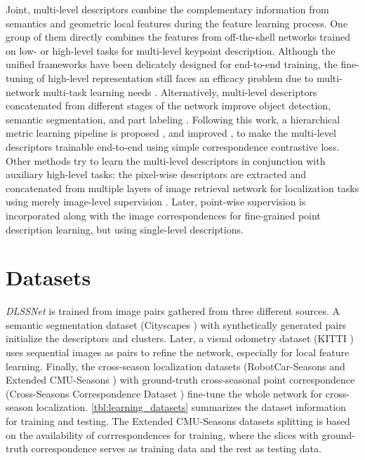 Joint, multi-level descriptors combine the complementary information from semantics and geometric local features during the feature learning process.  
One group of them \cite{luo2019contextdesc, hong2020learning} directly combines the features from off-the-shell networks trained on low- or high-level tasks for multi-level keypoint description.
Although the unified frameworks have been delicately designed for end-to-end training, the fine-tuning of high-level representation still faces an efficacy problem due to multi-network multi-task learning
needs \cite{luo2019contextdesc}.
Alternatively, multi-level descriptors concatenated from different stages of the network improve object detection, semantic segmentation, and part labeling \cite{hariharan2015hypercolumns}.
Following this work, a hierarchical metric learning pipeline is proposed \cite{fathy2018hierarchical}, and improved \cite{spencer2019scale}, to make the multi-level descriptors trainable end-to-end using simple correspondence contrastive loss.
Other methods try to learn the multi-level descriptors in conjunction with auxiliary high-level tasks: the pixel-wise descriptors are extracted and concatenated from multiple layers of image retrieval network for localization tasks using merely image-level supervision \cite{germain2019sparse}. 
Later, point-wise supervision \cite{sarlin2019coarse} is incorporated along with the image correspondences for fine-grained point description learning, but using single-level descriptions. 


\section{Datasets}

{\em DLSSNet} is trained from image pairs gathered from three different sources.
A semantic segmentation dataset (Cityscapes \cite{cordts2016cityscapes}) with synthetically generated pairs initialize the descriptors and clusters.
Later, a visual odometry dataset (KITTI \cite{geiger2012we}) uses sequential images as pairs to refine the network, especially for local feature learning. 
Finally, the cross-season localization datasets (RobotCar-Seasons \cite{Maddern2017IJRR} and Extended CMU-Seasons \cite{Badino2011}) with ground-truth cross-seasonal point correspondence
(Cross-Seasons Correspondence Dataset \cite{larsson2019cross}) fine-tune the whole network for cross-season localization. 
\ref{tbl:learning_datasets} summarizes the dataset information for training and testing.
The Extended CMU-Seasons datasets splitting is based on the availability of corrrespondences for training, where the slices with ground-truth correspondence serves as training data and the rest as testing data.


